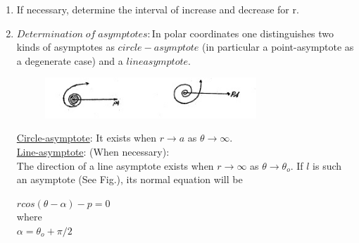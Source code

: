 \documentclass{amsbook}
\begin{document}
    \renewcommand{\headrulewidth}{0pt}

    \begin{enumerate}[1)] \itemsep2pt
        \setcounter{enumi}{2}
        \item{If necessary, determine the interval of increase and decrease for r.}\\

        \item {$Determination\; of\;  asymptotes: $In polar coordinates one distinguishes two kinds of asymptotes as $circle-asymptote$ (in particular a point-asymptote as a degenerate case) and a $lineasymptote$.}\\
        \begin{figure} [htbp]
            \begin{center}
                \includegraphics[width=300]
	            {images/b1p2-311-fig01-fig02.jpg}
            \end{center}
        \end{figure}
        \underline{Circle-asymptote}: It exists when $r \to a $ as $\theta \to \infty$.\\
        \underline{Line-asymptote}: (When necessary):\\

        \hspace{1cm}The direction of a line asymptote exists when $r \to \infty$ as $\theta \to \theta_o$. If $l$ is such an asymptote
        (See Fig.), its normal equation will be\\
        \begin{minipage}[c]{0.45\textwidth}
            \begin{itemize}\itemsep2pt
                \noindent
                $rcos(\theta - \alpha)-p=0 $ \\ 

                where \\ 

                \hspace{1cm}$\alpha = \theta_o +  {\pi}/{2}$ \\


\end{itemize}
\end{minipage}
\end{enumerate}
\end{document}
